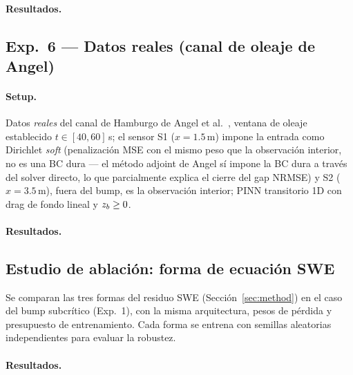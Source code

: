 \paragraph{Resultados.}

\subsection{Exp.\ 6 --- Datos reales (canal de oleaje de Angel)}
\label{sec:exp6}

\paragraph{Setup.}
Datos \emph{reales} del canal de Hamburgo de Angel et al.\ \cite{angel2024},
ventana de oleaje establecido $t\in[40,60]$\,s; el sensor S1 ($x=1.5$\,m)
impone la entrada como Dirichlet \emph{soft} (penalización MSE con el
mismo peso que la observación interior, no es una BC dura --- el método
adjoint de Angel sí impone la BC dura a través del solver directo, lo
que parcialmente explica el cierre del gap NRMSE) y S2 ($x=3.5$\,m),
fuera del bump, es la observación interior; PINN transitorio 1D con
drag de fondo lineal y $z_b\ge0$.

\paragraph{Resultados.}

\subsection{Estudio de ablación: forma de ecuación SWE}
\label{sec:ablation}

Se comparan las tres formas del residuo SWE (Sección~\ref{sec:method})
en el caso del bump subcrítico (Exp.\ 1), con la misma arquitectura,
pesos de pérdida y presupuesto de entrenamiento. Cada forma se entrena
con semillas aleatorias independientes para evaluar la robustez.

\paragraph{Resultados.}
